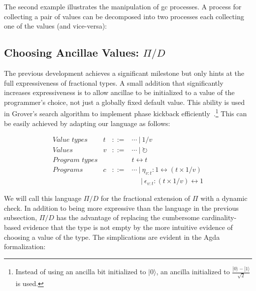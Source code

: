 \documentclass[sigplan,10pt,review,anonymous]{acmart}
\newcommand{\alt}{~|~}
\newcommand{\gcv}{\circlearrowright}
\newcommand{\ket}[1]{|#1\rangle}
\newcommand{\oneover}[1]{1/#1}
\begin{document}
The second example illustrates the manipulation of gc processes. A
process for collecting a pair of values can be decomposed into two
processes each collecting one of the values (and vice-versa):

\EtaEpsilonExampletwo{}

\subsection{Choosing Ancillae Values: $\Pi/D$}

The previous development achieves a significant milestone but only
hints at the full expressiveness of fractional types. A small addition
that significantly increases expressiveness is to allow ancillae to be
initialized to a value of the programmer's choice, not just a globally
fixed default value. This ability is used in Grover's search algorithm
to implement phase kickback
efficiently~\cite{howgrover}.\footnote{Instead of using an ancilla bit
  initialized to $\ket{0}$, an ancilla initialized to
  $\frac{\ket{0}-\ket{1}}{\sqrt{2}}$ is used.} This can be easily
achieved by adapting our language as follows:

\[\begin{array}{lrcl}
\textit{Value types} & t &::=& \cdots \alt \oneover{v} \\
\textit{Values}      & v &::=& \cdots \alt \gcv \\
\textit{Program types} &&& t \leftrightarrow t \\
\textit{Programs} & c &::=& \cdots \alt
   \eta_{v:t} : 1 \leftrightarrow (t \times \oneover{v}) \\
   &&& ~~~~~\alt \epsilon_{v:t} : (t \times \oneover{v}) \leftrightarrow 1
\end{array}\]

We will call this language $\Pi/D$ for the fractional extension of
$\Pi$ with a dynamic check. In addition to being more expressive than
the language in the previous subsection, $\Pi/D$ has the advantage of
replacing the cumbersome cardinality-based evidence that the type is
not empty by the more intuitive evidence of choosing a value of the
type. The simplications are evident in the Agda formalization:

\PIFDUdef{}

\vspace{-\baselineskip}

\PIFDCombdef{}

\vspace{-\baselineskip}
\end{document}
